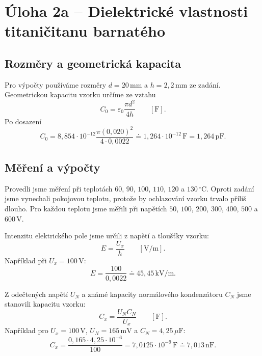 \documentclass[11pt,a4paper]{article}
\begin{document}
\section{Úloha 2a -- Dielektrické vlastnosti titaničitanu barnatého}
\subsection{Rozměry a geometrická kapacita}
Pro výpočty používáme rozměry $d=20\,\mathrm{mm}$ a $h=2{,}2\,\mathrm{mm}$ ze zadání. Geometrickou kapacitu vzorku určíme ze vztahu
\begin{equation}
C_0=\varepsilon_0\frac{\pi d^2}{4h}\qquad [\mathrm{F}].
\end{equation}
Po dosazení
\begin{equation}
C_0=8{,}854\cdot10^{-12}\frac{\pi(0{,}020)^2}{4\cdot0{,}0022}
\doteq1{,}264\cdot10^{-12}\,\mathrm{F}=1{,}264\,\mathrm{pF}.
\end{equation}

\subsection{Měření a výpočty}
Provedli jsme měření při teplotách $60$, $90$, $100$, $110$, $120$ a $130\,{}^\circ\mathrm{C}$. Oproti zadání jsme vynechali pokojovou teplotu, protože by ochlazování vzorku trvalo příliš dlouho. Pro každou teplotu jsme měřili při napětích $50$, $100$, $200$, $300$, $400$, $500$ a $600\,\mathrm{V}$.

Intenzitu elektrického pole jsme určili z napětí a tloušťky vzorku:
\begin{equation}
E=\frac{U_x}{h}\qquad [\mathrm{V/m}].
\end{equation}
Například při $U_x=100\,\mathrm{V}$:
\begin{equation}
E=\frac{100}{0{,}0022}\doteq45{,}45\,\mathrm{kV/m}.
\end{equation}

Z odečtených napětí $U_N$ a známé kapacity normálového kondenzátoru $C_N$ jsme stanovili kapacitu vzorku:
\begin{equation}
C_x=\frac{U_NC_N}{U_x}\qquad [\mathrm{F}].
\end{equation}
Například pro $U_x=100\,\mathrm{V}$, $U_N=165\,\mathrm{mV}$ a $C_N=4{,}25\,\mu\mathrm{F}$:
\begin{equation}
C_x=\frac{0{,}165\cdot4{,}25\cdot10^{-6}}{100}
=7{,}0125\cdot10^{-9}\,\mathrm{F}\doteq7{,}013\,\mathrm{nF}.
\end{equation}
\end{document}
